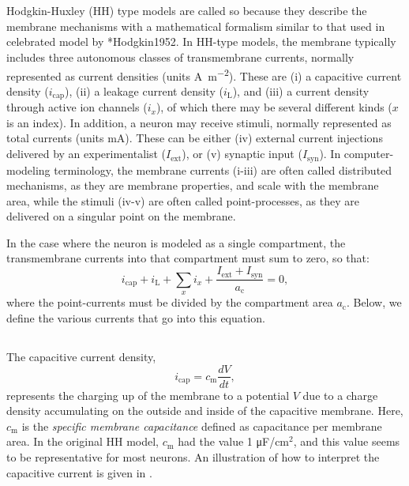 \section{}
\label{sec:Neuron:membranecurrents}
Hodgkin-Huxley (HH) type models are called so because they describe the membrane mechanisms with a mathematical formalism similar to that used in celebrated model by \citeasnoun**{Hodgkin1952}. In HH-type models, the membrane typically includes three autonomous classes of transmembrane currents, normally represented as current densities (units \si{\ampere\per\square\metre}). These are (i) a capacitive current density ($i_{\mathrm{cap}}$), (ii) a leakage current density ($i_{\mathrm{L}}$), and (iii) a current density through active ion channels ($i_x$), of which there may be several different kinds ($x$ is an index). In addition, a neuron may receive stimuli, normally represented as total currents (units \si{\milli\ampere}).
These can be either (iv) external current injections delivered by an experimentalist ($I_{\mathrm{ext}}$), or (v) synaptic input ($I_{\mathrm{syn}}$). In computer-modeling terminology, the membrane currents (i-iii) are often called distributed mechanisms, as they are membrane properties, and scale with the membrane area, while the stimuli (iv-v) are often called point-processes, as they are delivered on a singular point on the membrane. 

In the case where the neuron is modeled as a single compartment, the transmembrane currents into that compartment must sum to zero, so that:
\begin{equation}
i_{\mathrm{cap}}+ i_{\mathrm{L}} + \sum_x{i_x} +  \frac{I_{\mathrm{ext}} + I_{\mathrm{syn}}}{a_\text{c}} = 0,
\label{eq:Neuron:singlecomp_zerosum}
\end{equation}
where the point-currents must be divided by the compartment area $a_\text{c}$. Below, we define the various currents that go into this equation.

\subsection{}
\label{sec:Neuron:Cap}
The capacitive current density,
\begin{equation}
i_{\mathrm{cap}}= c_{\mathrm{m}} \frac{dV}{dt},
\label{eq:Neuron:HHcap}
\end{equation}
represents the charging up of the membrane to a potential $V$ due to a charge density accumulating on the outside and inside of the capacitive membrane. Here, $c_{\mathrm{m}}$ is the \textit{specific membrane capacitance} defined as capacitance per membrane area. In the original HH model, $c_{\mathrm{m}}$ had the value 1 \si{\micro \farad / \cm}$^2$, and this value seems to be representative for most neurons.  An illustration of how to interpret the capacitive current is given in . 

